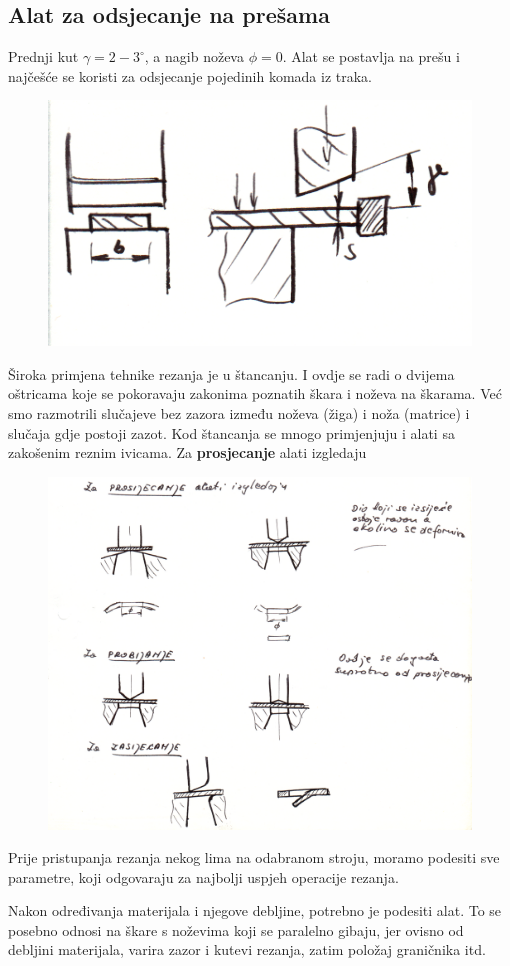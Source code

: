 \documentclass[a4paper,12pt]{article}
\numberwithin{figure}{section}
\begin{document}
\subsection{Alat za odsjecanje na prešama}
Prednji kut $\gamma = 2 - 3^{\circ}$, a nagib noževa $\phi = 0$. Alat se postavlja na prešu i najčešće se koristi za odsjecanje pojedinih komada iz traka.\par
\begin{figure}[!h]
\centering
\includegraphics[scale=0.2]{image_56-1.png}
\end{figure}
\FloatBarrier
Široka primjena tehnike rezanja je u štancanju. I ovdje se radi o dvijema oštricama koje se pokoravaju zakonima poznatih škara i noževa na škarama. Već smo razmotrili slučajeve bez zazora između noževa (žiga) i noža (matrice) i slučaja gdje postoji zazot. Kod štancanja se mnogo primjenjuju i alati sa zakošenim reznim ivicama. Za \textbf{prosjecanje} alati izgledaju 
\begin{figure}[!h]
\centering
\includegraphics[scale=0.17]{image_56-2.png}
\end{figure}
\FloatBarrier
Prije pristupanja rezanja nekog lima na odabranom stroju, moramo podesiti sve parametre, koji odgovaraju za najbolji uspjeh operacije rezanja. \par
Nakon određivanja materijala i njegove debljine, potrebno je podesiti alat. To se posebno odnosi na škare s noževima koji se paralelno gibaju, jer ovisno od debljini materijala, varira zazor i kutevi rezanja, zatim položaj graničnika itd.
\end{document}

